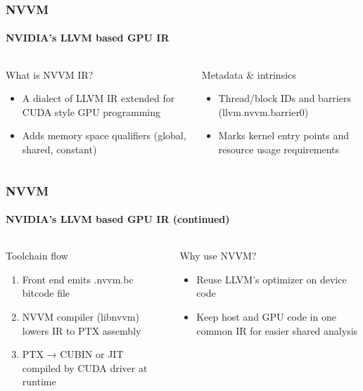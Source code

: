 \documentclass[aspectratio=169]{beamer}
\begin{document}
\begin{frame}
	\frametitle{NVVM}
	\framesubtitle{NVIDIA’s LLVM based GPU IR}

	\begin{columns}[T]
		\begin{column}{0.4\textwidth}
			What is NVVM IR? \fnmark
			\begin{itemize}
				\item A dialect of LLVM IR extended for CUDA style GPU programming
				\item Adds memory space qualifiers (global, shared, constant)
			\end{itemize}
		\end{column}
		\begin{column}{0.4\textwidth}
			Metadata \& intrinsics
			\begin{itemize}
				\item Thread/block IDs and barriers (llvm.nvvm.barrier0)
				\item Marks kernel entry points and resource usage requirements
			\end{itemize}
		\end{column}
	\end{columns}
\end{frame}

\begin{frame}
	\frametitle{NVVM}
	\framesubtitle{NVIDIA’s LLVM based GPU IR (continued)}

	\begin{columns}[T]
		\begin{column}{0.4\textwidth}
			Toolchain flow
			\begin{enumerate}
				\item Front end emits .nvvm.bc bitcode file
				\item NVVM compiler (libnvvm) lowers IR to PTX assembly
				\item PTX → CUBIN or JIT compiled by CUDA driver at runtime
			\end{enumerate}
		\end{column}
		\begin{column}{0.4\textwidth}
			Why use NVVM?
			\begin{itemize}
				\item Reuse LLVM’s optimizer on device code
				\item Keep host and GPU code in one common IR for easier shared analysis
			\end{itemize}
		\end{column}
	\end{columns}
\end{frame}
\end{document}
